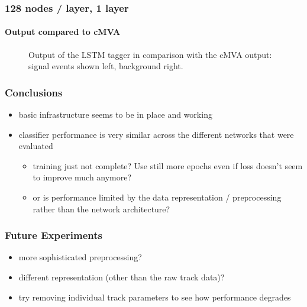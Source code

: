 \documentclass{beamer}
\begin{document}
\begin{frame}
  \frametitle{128 nodes / layer, 1 layer}
  \framesubtitle{Output compared to cMVA}
  \begin{figure}[htb]
    \centering

    \caption{Output of the LSTM tagger in comparison with the cMVA output: signal events shown left, background right.}
  \end{figure}
\end{frame}

\begin{frame}
  \frametitle{Conclusions}
  \begin{itemize}
  \item basic infrastructure seems to be in place and working
  \item classifier performance is very similar across the different networks that were evaluated
    \begin{itemize}
      \item training just not complete? Use still more epochs even if loss doesn't seem to improve much anymore?
      \item or is performance limited by the data representation / preprocessing rather than the network architecture?
    \end{itemize}
  \end{itemize}
\end{frame}

\begin{frame}
  \frametitle{Future Experiments}

  \begin{itemize}
  \item more sophisticated preprocessing?
  \item different representation (other than the raw track data)?
  \item try removing individual track parameters to see how performance degrades
  \end{itemize}
  
\end{frame}
\end{document}
